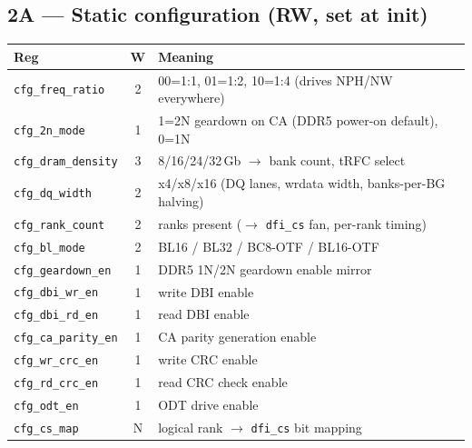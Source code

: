 \documentclass[11pt]{article}
\newcommand{\sig}[1]{\texttt{#1}}
\newcommand{\reg}[1]{\texttt{#1}}
\begin{document}
\subsection{2A --- Static configuration (RW, set at init)}
\begin{center}\begin{tabular}{@{}lcL{8.4cm}@{}}\toprule
Reg & W & Meaning \\ \midrule
\reg{cfg\_freq\_ratio} & 2 & 00=1:1, 01=1:2, 10=1:4 (drives NPH/NW everywhere) \\
\reg{cfg\_2n\_mode} & 1 & 1=2N geardown on CA (DDR5 power-on default), 0=1N \\
\reg{cfg\_dram\_density} & 3 & 8/16/24/32\,Gb $\to$ bank count, tRFC select \\
\reg{cfg\_dq\_width} & 2 & x4/x8/x16 (DQ lanes, wrdata width, banks-per-BG halving) \\
\reg{cfg\_rank\_count} & 2 & ranks present ($\to$ \sig{dfi\_cs} fan, per-rank timing) \\
\reg{cfg\_bl\_mode} & 2 & BL16 / BL32 / BC8-OTF / BL16-OTF \\
\reg{cfg\_geardown\_en} & 1 & DDR5 1N/2N geardown enable mirror \\
\reg{cfg\_dbi\_wr\_en} & 1 & write DBI enable \\
\reg{cfg\_dbi\_rd\_en} & 1 & read DBI enable \\
\reg{cfg\_ca\_parity\_en} & 1 & CA parity generation enable \\
\reg{cfg\_wr\_crc\_en} & 1 & write CRC enable \\
\reg{cfg\_rd\_crc\_en} & 1 & read CRC check enable \\
\reg{cfg\_odt\_en} & 1 & ODT drive enable \\
\reg{cfg\_cs\_map} & N & logical rank $\to$ \sig{dfi\_cs} bit mapping \\ \bottomrule
\end{tabular}\end{center}
\end{document}
